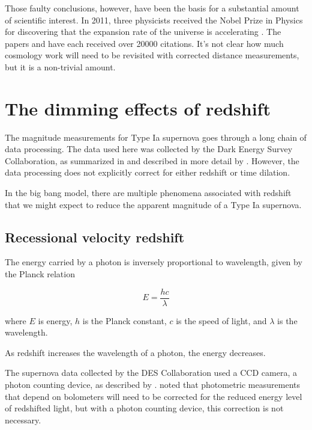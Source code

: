 \documentclass{article}
\begin{document}
Those faulty conclusions, however, have been the basis for a substantial amount
of scientific interest. In 2011, three physicists received the Nobel Prize in
Physics for discovering that the expansion rate of the universe is accelerating
\citet{straumann2012}. The papers \citet{riess1998} and \citet{perlmutter1999}
have each received over 20000 citations. It's not clear how much cosmology work
will need to be revisited with corrected distance measurements, but it is a
non-trivial amount.

\begin{displayquote}
\end{displayquote}

\section{The dimming effects of redshift}

The magnitude measurements for Type Ia supernova goes through a long chain of
data processing. The data used here was collected by the Dark Energy Survey
Collaboration, as summarized in \citet{abbott2024} and described in more detail
by \citet{vincenzi2024}. However, the data processing does not explicitly
correct for either redshift or time dilation.

In the big bang model, there are multiple phenomena associated with redshift that we
might expect to reduce the apparent magnitude of a Type Ia supernova.

\subsection{Recessional velocity redshift}

The energy carried by a photon is inversely proportional to wavelength, given
by the Planck relation

\begin{equation}
  E = \frac{hc}{\lambda}
\end{equation}

where $E$ is energy, $h$ is the Planck constant, $c$ is the speed of light, and
$\lambda$ is the wavelength.

As redshift increases the wavelength of a photon, the energy decreases.

The supernova data collected by the DES Collaboration used a CCD camera, a
photon counting device, as described by \citet{flaugher2015}.  \citet{kim1996}
noted that photometric measurements that depend on bolometers will need to be
corrected for the reduced energy level of redshifted light, but with a photon
counting device, this correction is not necessary.
\end{document}
